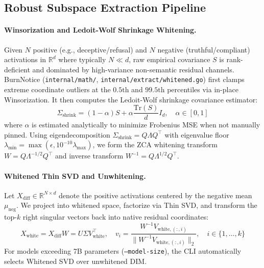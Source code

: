 \documentclass{article}
\begin{document}
\subsection{Robust Subspace Extraction Pipeline}\label{sec:extraction}

\paragraph{Winsorization and Ledoit-Wolf Shrinkage Whitening.}
Given $N$ positive (e.g., deceptive/refusal) and $N$ negative (truthful/compliant) activations in $\mathbb{R}^d$ where typically $N \ll d$, raw empirical covariance $S$ is rank-deficient and dominated by high-variance non-semantic residual channels. BurnNotice (\texttt{internal/math/}, \texttt{internal/extract/whitened.go}) first clamps extreme coordinate outliers at the $0.5\text{th}$ and $99.5\text{th}$ percentiles via in-place Winsorization. It then computes the Ledoit-Wolf shrinkage covariance estimator:
\begin{equation}
    \Sigma_{\text{shrink}} = (1 - \alpha) S + \alpha \frac{\text{Tr}(S)}{d} I_d, \quad \alpha \in [0, 1]
\end{equation}
where $\alpha$ is estimated analytically to minimize Frobenius MSE when not manually pinned. Using eigendecomposition $\Sigma_{\text{shrink}} = Q \Lambda Q^\top$ with eigenvalue floor $\lambda_{\min} = \max(\epsilon, 10^{-10}\lambda_{\max})$, we form the ZCA whitening transform $W = Q \Lambda^{-1/2} Q^\top$ and inverse transform $W^{-1} = Q \Lambda^{1/2} Q^\top$.

\paragraph{Whitened Thin SVD and Unwhitening.}
Let $X_{\text{diff}} \in \mathbb{R}^{N \times d}$ denote the positive activations centered by the negative mean $\mu_{\text{neg}}$. We project into whitened space, factorize via Thin SVD, and transform the top-$k$ right singular vectors back into native residual coordinates:
\begin{equation}
    X_{\text{white}} = X_{\text{diff}} W = U \Sigma V_{\text{white}}^\top, \quad v_i = \frac{W^{-1} V_{\text{white},(:,i)}}{\|W^{-1} V_{\text{white},(:,i)}\|_2}, \quad i \in \{1, \ldots, k\}
\end{equation}
For models exceeding 7B parameters (\texttt{--model-size}), the CLI automatically selects Whitened SVD over unwhitened DIM.
\end{document}
